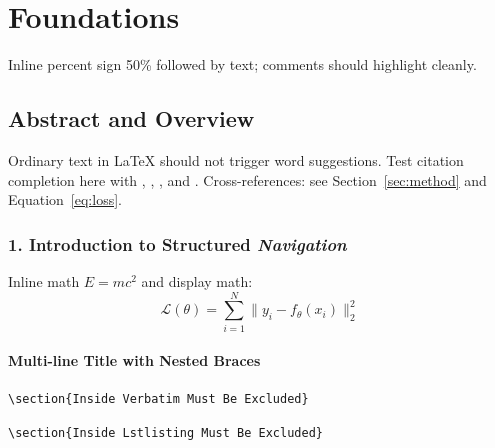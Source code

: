 \documentclass{article}
\begin{document}
\part{Foundations}

Inline percent sign 50\% followed by text; comments should highlight cleanly.

\chapter*{Abstract and Overview}

Ordinary text in LaTeX should not trigger word suggestions.
Test citation completion here with \cite{}, \citep{}, \citet{}, and \textcite{}.
Cross-references: see Section~\ref{sec:method} and Equation~\eqref{eq:loss}.

\section[Short Intro]{1. Introduction to \textbf{Structured} \emph{Navigation}}
\label{sec:intro}

Inline math $E = mc^2$ and display math:
\begin{equation}
\label{eq:loss}
\mathcal{L}(\theta) = \sum_{i=1}^{N} \| y_i - f_\theta(x_i) \|_2^2
\end{equation}

\subsection{Multi-line
  Title with {Nested Braces}}

\begin{verbatim}
\section{Inside Verbatim Must Be Excluded}
\end{verbatim}

\begin{lstlisting}
\section{Inside Lstlisting Must Be Excluded}
\end{lstlisting}
\end{document}
